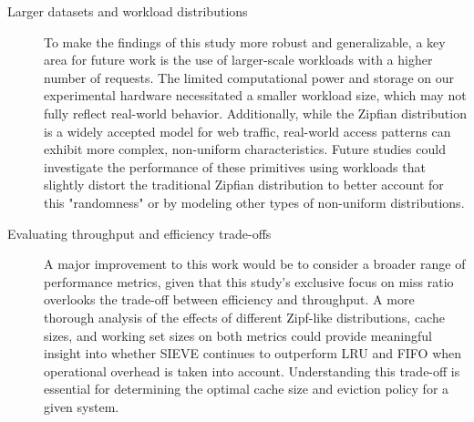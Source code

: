 \begin{description}

    \item[Larger datasets and workload distributions]
    To make the findings of this study more robust and generalizable, a key area for future work is the use of larger-scale workloads with a higher number of requests. The limited computational power and storage on our experimental hardware necessitated a smaller workload size, which may not fully reflect real-world behavior. Additionally, while the Zipfian distribution is a widely accepted model for web traffic, real-world access patterns can exhibit more complex, non-uniform characteristics. Future studies could investigate the performance of these primitives using workloads that slightly distort the traditional Zipfian distribution to better account for this "randomness" or by modeling other types of non-uniform distributions.


    \item[Evaluating throughput and efficiency trade-offs]
    A major improvement to this work would be to consider a broader range of performance metrics, given that this study's exclusive focus on miss ratio overlooks the trade-off between efficiency and throughput. A more thorough analysis of the effects of different Zipf-like distributions, cache sizes, and working set sizes on both metrics could provide meaningful insight into whether SIEVE continues to outperform LRU and FIFO when operational overhead is taken into account. Understanding this trade-off is essential for determining the optimal cache size and eviction policy for a given system.


\end{description}
